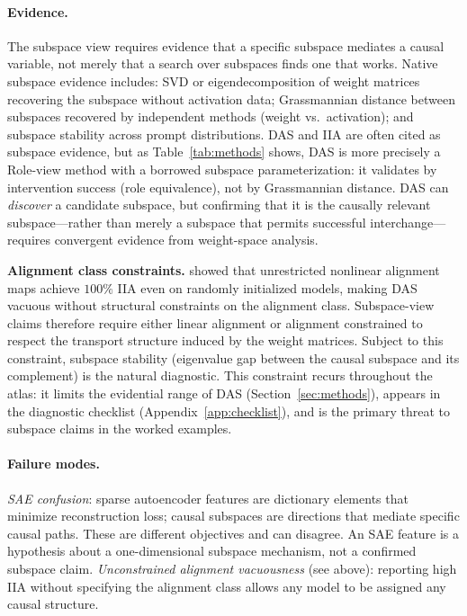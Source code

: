 \documentclass{article}
\begin{document}
\paragraph{Evidence.}
The subspace view requires evidence that a specific subspace mediates a
causal variable, not merely that a search over subspaces finds one that
works.  Native subspace evidence includes: SVD or eigendecomposition of
weight matrices recovering the subspace without activation data;
Grassmannian distance between subspaces recovered by independent methods
(weight vs.\ activation); and subspace stability across prompt
distributions.  DAS and IIA are often cited as subspace evidence, but as
Table~\ref{tab:methods} shows, DAS is more precisely a Role-view method
with a borrowed subspace parameterization: it validates by intervention
success (role equivalence), not by Grassmannian distance.  DAS can
\emph{discover} a candidate subspace, but confirming that it is the
causally relevant subspace---rather than merely a subspace that permits
successful interchange---requires convergent evidence from weight-space
analysis.

\textbf{Alignment class constraints.}  \citet{sutter2025}
showed that unrestricted nonlinear alignment maps achieve $100\%$ IIA
even on randomly initialized models, making DAS vacuous without
structural constraints on the alignment class.  Subspace-view claims
therefore require either linear alignment or alignment constrained to
respect the transport structure induced by the weight matrices.  Subject
to this constraint, subspace stability (eigenvalue gap between the causal
subspace and its complement) is the natural diagnostic.  This constraint
recurs throughout the atlas: it limits the evidential range of DAS
(Section~\ref{sec:methods}), appears in the diagnostic checklist
(Appendix~\ref{app:checklist}), and is the primary threat to subspace
claims in the worked examples.

\paragraph{Failure modes.}
\emph{SAE confusion}: sparse autoencoder features are dictionary elements
that minimize reconstruction loss; causal subspaces are directions that
mediate specific causal paths.  These are different objectives and can
disagree.  An SAE feature is a hypothesis about a one-dimensional
subspace mechanism, not a confirmed subspace claim.  \emph{Unconstrained alignment vacuousness} (see above):
reporting high IIA without specifying the alignment class allows any
model to be assigned any causal structure.
\end{document}
